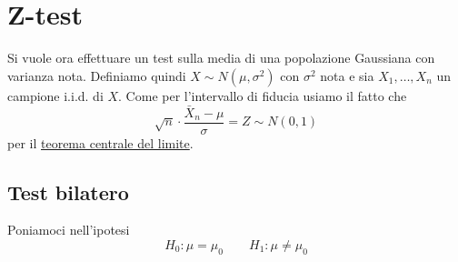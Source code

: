 \section{Z-test}\label{sec: z-test}
Si vuole ora effettuare un test sulla media di una popolazione Gaussiana con varianza nota.
Definiamo quindi $X \sim N(\mu, \sigma^2)$ con $\sigma^2$ nota e sia $X_1, \dots, X_n$ un campione
i.i.d. di $X$. Come per l'intervallo di fiducia usiamo il fatto che
\[ \sqrt{n} \cdot \frac{\bar{X}_n - \mu}{\sigma} = Z \sim N(0,1) \]
per il \hyperref[th: tcl]{teorema centrale del limite}.

\subsection{Test bilatero}
Poniamoci nell'ipotesi
\[ H_0: \mu = \mu_0 \qquad H_1: \mu \neq \mu_0 \]

